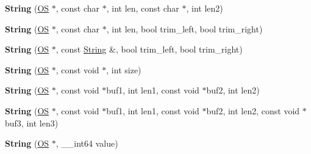 \begin{DoxyCompactItemize}
\item 
{\bfseries String} (\hyperlink{class_object_script_1_1_o_s}{OS} $\ast$, const char $\ast$, int len, const char $\ast$, int len2)\hypertarget{class_object_script_1_1_o_s_1_1_core_1_1_string_a57b30a6fd6c4e96690c5abda9758dc40}{}\label{class_object_script_1_1_o_s_1_1_core_1_1_string_a57b30a6fd6c4e96690c5abda9758dc40}

\item 
{\bfseries String} (\hyperlink{class_object_script_1_1_o_s}{OS} $\ast$, const char $\ast$, int len, bool trim\+\_\+left, bool trim\+\_\+right)\hypertarget{class_object_script_1_1_o_s_1_1_core_1_1_string_a742f862aec4c7c7c8e320e194c05e724}{}\label{class_object_script_1_1_o_s_1_1_core_1_1_string_a742f862aec4c7c7c8e320e194c05e724}

\item 
{\bfseries String} (\hyperlink{class_object_script_1_1_o_s}{OS} $\ast$, const \hyperlink{class_object_script_1_1_o_s_1_1_core_1_1_string}{String} \&, bool trim\+\_\+left, bool trim\+\_\+right)\hypertarget{class_object_script_1_1_o_s_1_1_core_1_1_string_a2aab0370f95ec0f58361cd599dff1a3f}{}\label{class_object_script_1_1_o_s_1_1_core_1_1_string_a2aab0370f95ec0f58361cd599dff1a3f}

\item 
{\bfseries String} (\hyperlink{class_object_script_1_1_o_s}{OS} $\ast$, const void $\ast$, int size)\hypertarget{class_object_script_1_1_o_s_1_1_core_1_1_string_a991b8d229eb107339082ff7f18e2f463}{}\label{class_object_script_1_1_o_s_1_1_core_1_1_string_a991b8d229eb107339082ff7f18e2f463}

\item 
{\bfseries String} (\hyperlink{class_object_script_1_1_o_s}{OS} $\ast$, const void $\ast$buf1, int len1, const void $\ast$buf2, int len2)\hypertarget{class_object_script_1_1_o_s_1_1_core_1_1_string_a8e964d51c1b21a75d724f81b184aecf5}{}\label{class_object_script_1_1_o_s_1_1_core_1_1_string_a8e964d51c1b21a75d724f81b184aecf5}

\item 
{\bfseries String} (\hyperlink{class_object_script_1_1_o_s}{OS} $\ast$, const void $\ast$buf1, int len1, const void $\ast$buf2, int len2, const void $\ast$buf3, int len3)\hypertarget{class_object_script_1_1_o_s_1_1_core_1_1_string_a121c6dd4cd649b8fb5a84f090613f67c}{}\label{class_object_script_1_1_o_s_1_1_core_1_1_string_a121c6dd4cd649b8fb5a84f090613f67c}

\item 
{\bfseries String} (\hyperlink{class_object_script_1_1_o_s}{OS} $\ast$, \+\_\+\+\_\+int64 value)\hypertarget{class_object_script_1_1_o_s_1_1_core_1_1_string_adc7306eb215faea5a63449b8a8335e12}{}\label{class_object_script_1_1_o_s_1_1_core_1_1_string_adc7306eb215faea5a63449b8a8335e12}


\end{DoxyCompactItemize}
